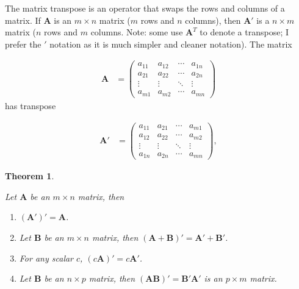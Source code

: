 \documentclass[
]{book}
\newtheorem{theorem}{Theorem}[chapter]
\theoremstyle{definition}
\theoremstyle{definition}
\theoremstyle{definition}
\theoremstyle{remark}
\begin{document}
The matrix transpose is an operator that swaps the rows and columns of a matrix. If \(\mathbf{A}\) is an \(m \times n\) matrix (\(m\) rows and \(n\) columns), then \(\mathbf{A}'\) is a \(n \times m\) matrix (\(n\) rows and \(m\) columns. Note: some use \(\mathbf{A}^T\) to denote a transpose; I prefer the \('\) notation as it is much simpler and cleaner notation). The matrix

\[
\begin{aligned}
\mathbf{A} & = \begin{pmatrix} a_{11} & a_{12} & \cdots & a_{1n} \\
a_{21} & a_{22} & \cdots & a_{2n} \\
\vdots & \vdots & \ddots & \vdots \\
a_{m1} & a_{m2} & \cdots & a_{mn}
\end{pmatrix}
\end{aligned}
\]
has transpose

\[
\begin{aligned}
\mathbf{A}' & = \begin{pmatrix} a_{11} & a_{21} & \cdots & a_{m1} \\
a_{12} & a_{22} & \cdots & a_{m2} \\
\vdots & \vdots & \ddots & \vdots \\
a_{1n} & a_{2n} & \cdots & a_{mn}
\end{pmatrix},
\end{aligned}
\]

\begin{theorem}
\protect\hypertarget{thm:unlabeled-div-74}{}\label{thm:unlabeled-div-74}

Let \(\mathbf{A}\) be an \(m \times n\) matrix, then

\begin{enumerate}
\def\labelenumi{\arabic{enumi})}
\item
  \((\mathbf{A}')' = \mathbf{A}\).
\item
  Let \(\mathbf{B}\) be an \(m \times n\) matrix, then \((\mathbf{A} + \mathbf{B})' = \mathbf{A}' + \mathbf{B}'\).
\item
  For any scalar \(c\), \((c \mathbf{A})' = c \mathbf{A}'\).
\item
  Let \(\mathbf{B}\) be an \(n \times p\) matrix, then \(( \mathbf{A} \mathbf{B})' = \mathbf{B}' \mathbf{A}'\) is an \(p \times m\) matrix.
\end{enumerate}

\end{theorem}
\end{document}
